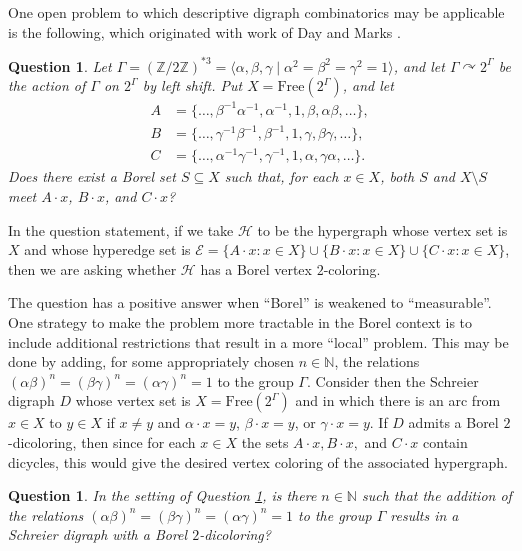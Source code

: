\documentclass[psamsfonts]{amsart}
\newtheorem{quest}[thm]{Question}
\theoremstyle{definition}
\newcommand{\Z}{\mathbb Z}
\newcommand{\N}{\mathbb N}
\theoremstyle{remark}
\numberwithin{equation}{section}
\begin{document}
One open problem to which descriptive digraph combinatorics may be applicable is the following, which originated with work of Day and Marks \cite{dm2020}. 

\begin{quest}
\label{quest:hypergraphs}
    Let $\Gamma = (\Z/2\Z)^{* 3} = \langle \alpha, \beta, \gamma \mathrel{\vert} \alpha^2 = \beta^2 = \gamma^2 = 1 \rangle$, and let $\Gamma \curvearrowright 2^{\Gamma}$ be the action of $\Gamma$ on $2^{\Gamma}$ by left shift. Put $X = \text{Free}(2^{\Gamma})$, and let
    \begin{align*}
        A & = \{\dots, \beta^{-1}\alpha^{-1}, \alpha^{-1}, 1, \beta, \alpha \beta, \dots\}, \\
        B & = \{\dots, \gamma^{-1}\beta^{-1}, \beta^{-1}, 1, \gamma, \beta \gamma, \dots\}, \\
        C & = \{\dots, \alpha^{-1}\gamma^{-1}, \gamma^{-1}, 1, \alpha, \gamma \alpha, \dots\}.
    \end{align*}
    Does there exist a Borel set $S \subseteq X$ such that, for each $x \in X$, both $S$ and $X \setminus S$ meet $A \cdot x$, $B \cdot x$, and $C \cdot x$?
\end{quest}

In the question statement, if we take $\mathcal{H}$ to be the hypergraph whose vertex set is $X$ and whose hyperedge set is $\mathcal{E} = \{A \cdot x : x \in X\} \cup \{B \cdot x : x \in X \} \cup \{C \cdot x : x \in X\}$, then we are asking whether $\mathcal{H}$ has a Borel vertex $2$-coloring. 

The question has a positive answer when ``Borel'' is weakened to ``measurable''. One strategy to make the problem more tractable in the Borel context is to include additional restrictions that result in a more ``local'' problem. This may be done by adding, for some appropriately chosen $n \in \N$, the relations $(\alpha \beta)^n = (\beta \gamma)^n = (\alpha \gamma)^n = 1$ to the group $\Gamma$. Consider then the Schreier digraph $D$ whose vertex set is $X = \text{Free}(2^{\Gamma})$ and in which there is an arc from $x \in X$ to $y \in X$ if $x \neq y$ and $\alpha \cdot x = y$, $\beta \cdot x = y$, or $\gamma \cdot x = y$. If $D$ admits a Borel $2$-dicoloring, then since for each $x \in X$ the sets $A \cdot x, B \cdot x,$ and $C \cdot x$ contain dicycles, this would give the desired vertex coloring of the associated hypergraph. 

\begin{quest}
\label{quest:local hypergraphs}
    In the setting of Question \ref{quest:hypergraphs}, is there $n \in \N$ such that the addition of the relations $(\alpha \beta)^n = (\beta \gamma)^n = (\alpha \gamma)^n = 1$ to the group $\Gamma$ results in a Schreier digraph with a Borel $2$-dicoloring?
\end{quest}
\end{document}
